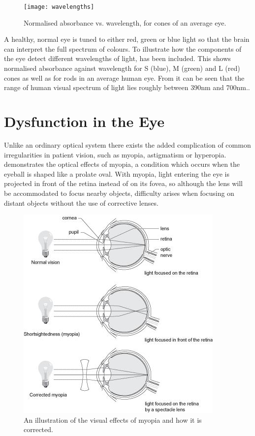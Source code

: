  \begin{figure}[H]
\centering
  \texttt{[image: wavelengths]}
\caption{Normalised absorbance vs. wavelength, for cones of an average eye.\cite{wikicones}}
\label{fig:wavelengths}
\end{figure}

A healthy, normal eye is tuned to either red, green or blue light so that the
brain can interpret the full spectrum of colours. To illustrate how the
components of the eye detect different wavelengths of light,
 has been included. This shows normalised absorbance
against wavelength for S (blue), M (green) and L (red) cones as well as for
rods in an average human eye.  From  it can be seen
that the range of human visual spectrum of light lies roughly between 390nm
and 700nm.\cite{starr2010biology}.

\section{Dysfunction in the Eye}

Unlike an ordinary optical system there exists the added complication
of common irregularities in patient vision, such as myopia, astigmatism
or hyperopia.  demonstrates the optical effects of myopia,
a condition which occurs when the eyeball is shaped like a prolate oval.
\cite{saine2002ophthalmic} With myopia, light entering the eye is projected
in front of the retina instead of on its fovea, so although the lens will be
accommodated to focus nearby objects, difficulty arises when focusing on 
distant objects without the use of corrective lenses.

\begin{figure}[H]
\centering
\includegraphics{figures/myopia}
\caption{An illustration of the visual effects of myopia and how it is corrected.\cite{yannuzzi2011retinal}}
\label{fig:myop}
\end{figure}

